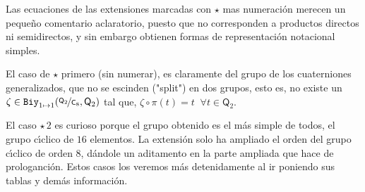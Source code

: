 \documentclass[final,12pt,a4paper,twoside,fleqn]{extbook}
\newcommand{\biyuno}[1]{\ensuremath{
        {{\mathtt{Biy}}_{1\mapsto1}}
        {\left({#1}\right)}
}}
\newcommand{\grcoc}[2]{\ensuremath{
        \nicefrac{#1}{#2}
}}
\newcommand{\grclass}[1]{\ensuremath{\mathsf{#1}}}
\newcommand{\cyclicgr}[1]{\ensuremath{{\grclass{C}}_{#1}}}
\newcommand{\quaterniongr}[1]{\ensuremath{{\grclass{Q}}_{#1}}}
\theoremstyle{definition}
\theoremstyle{remark}
\begin{document}
Las ecuaciones de las extensiones marcadas con $\star$ mas numeraci\'on merecen un peque{\~n}o comentario aclaratorio,
puesto que no corresponden a productos directos ni semidirectos, y sin embargo obtienen formas de representaci\'on
notacional simples.

El caso de $\star$ primero (sin numerar), es claramente del grupo de los cuaterniones generalizados, que no se escinden
("split") en dos grupos, esto es, no existe un
$\zeta         \in \biyuno{\grcoc{\quaterniongr{2}}{\cyclicgr{8}},\quaterniongr{2}}$
tal que, $\zeta         \circ \pi \left(t\right)=t\;\;\forall t         \in \quaterniongr{2}$.


El caso $\star\,2$ es curioso porque el grupo obtenido es el m\'as simple de todos, el grupo c{\'\i}clico de $16$ elementos.
La extensi\'on solo ha ampliado el orden del grupo c{\'\i}clico de orden $8$, d\'andole un aditamento en la parte ampliada
que hace de prologanci\'on. Estos casos los veremos m\'as detenidamente al ir poniendo sus tablas y dem\'as informaci\'on.
\end{document}
